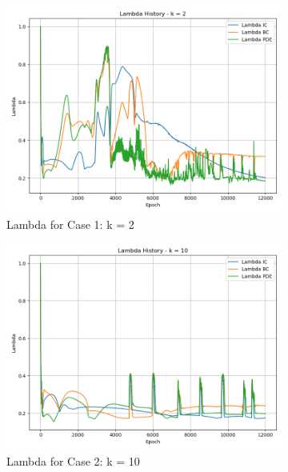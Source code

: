 \documentclass[11pt]{article}
\begin{document}
\begin{figure}[h!]
    \centering
    \begin{subfigure}[b]{0.48\textwidth}
        \includegraphics[width=\textwidth]{2D_Lambda_K1.png}
        \caption{Lambda for Case 1: k = 2}
        \label{fig:Lambda_K1}
    \end{subfigure}
    \hfill
    \begin{subfigure}[b]{0.48\textwidth}
        \includegraphics[width=\textwidth]{2D_Lambda_K2.png}
        \caption{Lambda for Case 2: k = 10}
        \label{fig:Lambda_K2}
    \end{subfigure}
    \hfill
    \begin{subfigure}[b]{0.48\textwidth}

\end{subfigure}
\end{figure}
\end{document}

